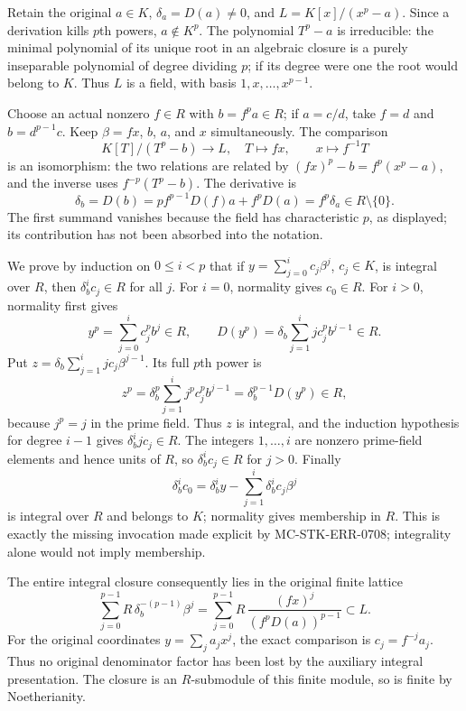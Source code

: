 Retain the original \(a\in K\), \(\delta_a=D(a)\ne0\), and \(L=K[x]/(x^p-a)\). Since a derivation kills \(p\)th powers, \(a\notin K^p\). The polynomial \(T^p-a\) is irreducible: the minimal polynomial of its unique root in an algebraic closure is a purely inseparable polynomial of degree dividing \(p\); if its degree were one the root would belong to \(K\). Thus \(L\) is a field, with basis \(1,x,\ldots,x^{p-1}\).

Choose an actual nonzero \(f\in R\) with \(b=f^pa\in R\); if \(a=c/d\), take \(f=d\) and \(b=d^{p-1}c\). Keep \(\beta=fx\), \(b\), \(a\), and \(x\) simultaneously. The comparison \[
 K[T]/(T^p-b)\longrightarrow L,\quad T\longmapsto fx,
 \qquad x\longmapsto f^{-1}T
\] is an isomorphism: the two relations are related by \((fx)^p-b=f^p(x^p-a)\), and the inverse uses \(f^{-p}(T^p-b)\). The derivative is \[
 \delta_b=D(b)=p f^{p-1}D(f)a+f^pD(a)=f^p\delta_a\in R\setminus\{0\}.
\] The first summand vanishes because the field has characteristic \(p\), as displayed; its contribution has not been absorbed into the notation.

We prove by induction on \(0\leq i<p\) that if \(y=\sum_{j=0}^{i}c_j\beta^j\), \(c_j\in K\), is integral over \(R\), then \(\delta_b^i c_j\in R\) for all \(j\). For \(i=0\), normality gives \(c_0\in R\). For \(i>0\), normality first gives \[
 y^p=\sum_{j=0}^{i}c_j^p b^j\in R,
 \qquad
 D(y^p)=\delta_b\sum_{j=1}^{i}j c_j^p b^{j-1}\in R.
\] Put \(z=\delta_b\sum_{j=1}^{i}j c_j\beta^{j-1}\). Its full \(p\)th power is \[
 z^p=\delta_b^p\sum_{j=1}^{i}j^p c_j^p b^{j-1}
     =\delta_b^{p-1}D(y^p)\in R,
\] because \(j^p=j\) in the prime field. Thus \(z\) is integral, and the induction hypothesis for degree \(i-1\) gives \(\delta_b^i j c_j\in R\). The integers \(1,\ldots,i\) are nonzero prime-field elements and hence units of \(R\), so \(\delta_b^i c_j\in R\) for \(j>0\). Finally \[
 \delta_b^i c_0=\delta_b^i y-\sum_{j=1}^{i}\delta_b^i c_j\beta^j
\] is integral over \(R\) and belongs to \(K\); normality gives membership in \(R\). This is exactly the missing invocation made explicit by MC-\AlgebraIdentifierBreak{}STK-\AlgebraIdentifierBreak{}ERR-\AlgebraIdentifierBreak{}0708; integrality alone would not imply membership.

The entire integral closure consequently lies in the original finite lattice \[
 \sum_{j=0}^{p-1}R\,\delta_b^{-(p-1)}\beta^j
 =\sum_{j=0}^{p-1}R\,\frac{(fx)^j}{(f^pD(a))^{p-1}}\subset L.
\] For the original coordinates \(y=\sum_j a_jx^j\), the exact comparison is \(c_j=f^{-j}a_j\). Thus no original denominator factor has been lost by the auxiliary integral presentation. The closure is an \(R\)-submodule of this finite module, so is finite by Noetherianity.


